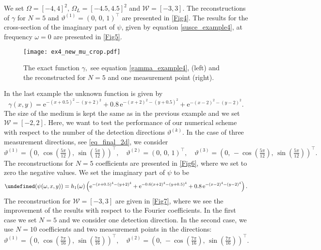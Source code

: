 \documentclass[a4paper,twoside,10pt]{article}
\theoremstyle{break}
\theoremstyle{nonumberplain}
\newcommand{\e}{\mathrm e}
\let\IM\Im
\let\Im=\undefined
\DeclareMathOperator{\Im}{\IM m}
\begin{document}
We set $\Omega = [-4,4]^2,  \, \Omega_L = [-4.5,4.5]^2$  and $\mathcal{W}=[-3,3].$ The reconstructions of $\gamma$ for $N=5$ and $\vartheta^{(1)}=(0, \, 0,\, 1)^\top$ are presented in \autoref{Fig4}. The results for the cross-section of the imaginary part of $\psi$, given by equation \eqref{susce_example4}, at frequency $\omega=0$ are presented in \autoref{Fig5}. %
 
 \begin{figure}[t]
\begin{center}
\texttt{[image: ex4\_new\_mu\_crop.pdf]}
\caption{The exact function $\gamma,$ see equation \eqref{gamma_example4}, (left) and  the reconstructed for $N=5$ and one measurement point (right).}\label{Fig4}
\end{center}
\end{figure} 
 
In the last example the unknown function is given by
\begin{equation}\label{gamma_example5}
\gamma (x,y) =  \e^{ -(x+0.5)^2- (y+2)^2}  + 0.8\,\e^{ -(x+2)^2- (y+0.5)^2}  +  \e^{ -(x-2)^2- (y-2)^2} .
\end{equation}
 The size of the medium is kept the same as in the previous example and we set $\mathcal{W}=[-2,2]$. Here, we want to test the performance of our numerical scheme with respect to the number of the detection directions $\vartheta^{(k)}.$ In the case of three measurement directions, see \eqref{eq_final_2d}, we consider
\[
\vartheta^{(1)} = \left(0, \, \cos (\tfrac{5\pi}{12} ),\, \sin (\tfrac{5\pi}{12}) \right)^\top , \quad \vartheta^{(2)} = \left(0, \,0,\,1\right)^\top , \quad \vartheta^{(3)} = \left(0, \, -\cos (\tfrac{5\pi}{12}),\, \sin (\tfrac{5\pi}{12}) \right)^\top .
\]
The reconstructions for $N=5$ coefficients are presented in \autoref{Fig6}, where  we set to zero the negative values.
  We set the imaginary part of $\psi$ to be
\begin{equation}\label{susce_example5}
\Im (\psi (\omega,x,y)) = h_1 (\omega) \left(\e^{ -(x+0.5)^4-  (y+2)^4} + \e^{ -0.6(x+2)^4-  (y+0.5)^4}  +  0.8\, \e^{ -(x-2)^4-  (y-2)^4} \right).
\end{equation}
The reconstruction for $\mathcal{W}=[-3,3]$ are given in \autoref{Fig7}, where we see the improvement of the results with respect to the Fourier coefficients. In the first case we set $N=5$ and we consider one detection direction. In the second case, we use $N=10$ coefficients and two measurement points in the directions:
\[
\vartheta^{(1)} = \left(0, \, \cos (\tfrac{7\pi}{16}),\, \sin (\tfrac{7\pi}{16}) \right)^\top , \quad \vartheta^{(2)} = \left(0, \, -\cos (\tfrac{7\pi}{16}),\, \sin (\tfrac{7\pi}{16}) \right)^\top .
\]
 
\end{document}
